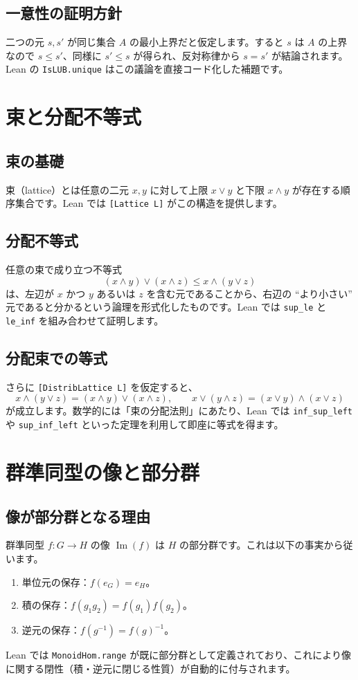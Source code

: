 \documentclass[10pt]{ltjsarticle}
\begin{document}
\subsection{一意性の証明方針}
二つの元 $s, s'$ が同じ集合 $A$ の最小上界だと仮定します。すると $s$ は $A$ の上界なので $s \leq s'$、同様に $s' \leq s$ が得られ、反対称律から $s = s'$ が結論されます。Lean の \verb|IsLUB.unique| はこの議論を直接コード化した補題です。

\section{束と分配不等式}
\subsection{束の基礎}
束（lattice）とは任意の二元 $x,y$ に対して上限 $x \lor y$ と下限 $x \land y$ が存在する順序集合です。Lean では \verb|[Lattice L]| がこの構造を提供します。

\subsection{分配不等式}
任意の束で成り立つ不等式
\[
  (x \land y) \lor (x \land z) \leq x \land (y \lor z)
\]
は、左辺が $x$ かつ $y$ あるいは $z$ を含む元であることから、右辺の ``より小さい'' 元であると分かるという論理を形式化したものです。Lean では \verb|sup_le| と \verb|le_inf| を組み合わせて証明します。

\subsection{分配束での等式}
さらに \verb|[DistribLattice L]| を仮定すると、
\[
  x \land (y \lor z) = (x \land y) \lor (x \land z), \qquad
  x \lor (y \land z) = (x \lor y) \land (x \lor z)
\]
が成立します。数学的には「束の分配法則」にあたり、Lean では \verb|inf_sup_left| や \verb|sup_inf_left| といった定理を利用して即座に等式を得ます。

\section{群準同型の像と部分群}
\subsection{像が部分群となる理由}
群準同型 $f : G \to H$ の像 $\operatorname{Im}(f)$ は $H$ の部分群です。これは以下の事実から従います。
\begin{enumerate}
  \item 単位元の保存：$f(e_G) = e_H$。
  \item 積の保存：$f(g_1 g_2) = f(g_1) f(g_2)$。
  \item 逆元の保存：$f(g^{-1}) = f(g)^{-1}$。
\end{enumerate}
Lean では \verb|MonoidHom.range| が既に部分群として定義されており、これにより像に関する閉性（積・逆元に閉じる性質）が自動的に付与されます。
\end{document}
